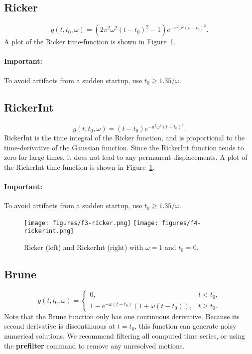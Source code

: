 \documentclass[11pt]{report}
\begin{document}
\subsection{Ricker} \label{ricker}
  \[
  g(t,t_0,\omega) = \left(2 \pi^2 \omega^2 (t - t_0)^2 - 1\right) e^{- \pi^2 \omega^2 (t - t_0)^2}.
  \]
A plot of the Ricker time-function is shown in Figure~\ref{fig:rickers}.

\paragraph{Important:} To avoid artifacts from a sudden startup, use
$t_0 \geq 1.35/\omega$.

\subsection{RickerInt}\label{rickerint}
  \[
  g(t,t_0,\omega) = (t - t_0) e^{- \pi^2 \omega^2 (t - t_0)^2}.
  \]
RickerInt is the time integral of the Ricker function, and is proportional to the time-derivative of
the Gaussian function. Since the RickerInt function tends to zero for large times, it does not lead
to any permanent displacements. A plot of the RickerInt time-function is shown in
Figure~\ref{fig:rickers}.
\paragraph{Important:} To avoid artifacts from a sudden startup, use
$t_0 \geq 1.35/\omega$.
\begin{figure}
\begin{centering}
  \texttt{[image: figures/f3-ricker.png]}
  \texttt{[image: figures/f4-rickerint.png]}
  \caption{Ricker (left) and RickerInt (right) with $\omega=1$ and $t_0=0$.}
  \label{fig:rickers}
\end{centering}
\end{figure}  
%
\subsection{Brune} 
 \label{brune}
\[
 g(t,t_0,\omega) = \left\{
\begin{array}{ll} 
0, & t < t_0, \\ 
1 - e^{-\omega(t-t_0)}( 1+\omega(t-t_0) ), & t \geq t_0.
\end{array}
\right.
\]
Note that the Brune function only has one continuous derivative. Because its second derivative is discontinuous at
$t=t_0$, this function can generate noisy numerical solutions. We recommend filtering all computed time
series, or using the {\bf prefilter} command to remove any unresolved motions.
\end{document}

